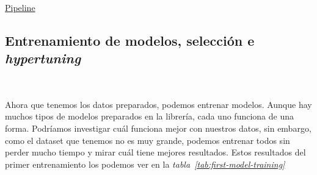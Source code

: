 \href{https://scikit-learn.org/stable/modules/generated/sklearn.pipeline.Pipeline.html}{Pipeline}


\subsection{Entrenamiento de modelos, selección e \textit{hypertuning}}\ \label{sec:entrenamiento}

Ahora que tenemos los datos preparados, podemos entrenar modelos. Aunque hay muchos tipos de modelos preparados en la librería, cada uno funciona de una forma. Podríamos investigar cuál funciona mejor con nuestros datos, sin embargo, como el \gls{dataset} que tenemos no es muy grande, podemos entrenar todos sin perder mucho tiempo y mirar cuál tiene mejores resultados. Estos resultados del primer entrenamiento los podemos ver en la \textit{tabla\ \ref{tab:first-model-training}}

